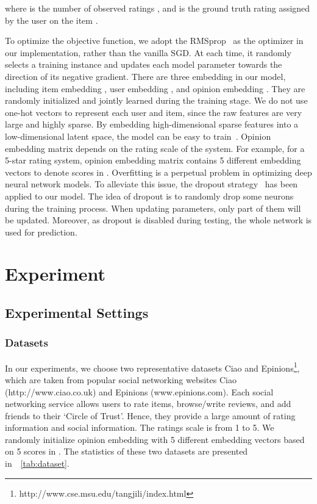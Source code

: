 \documentclass[sigconf]{acmart} \copyrightyear{2019}
\begin{document}
\noindent where  is the number of observed ratings , and  is the ground truth rating assigned by the user  on the item .

To optimize the objective function, we adopt the RMSprop~\cite{tieleman2012lecture} as the optimizer in our implementation, rather than the vanilla SGD. At each time, it randomly selects a training instance and updates each model parameter towards the direction of its negative gradient. There are three embedding in our model, including item embedding , user embedding , and opinion embedding . They are randomly initialized and jointly learned during the training stage.  We do not use one-hot vectors to represent each user and item, since the raw features are very large and highly sparse. By embedding high-dimensional sparse features into a low-dimensional latent space, the model can be easy to train~\cite{He2017NCF}. Opinion embedding matrix  depends on the rating scale of the system. For example, for a 5-star rating system,  opinion embedding matrix  contains 5 different embedding vectors to denote scores in . Overfitting is a perpetual problem in optimizing deep neural network models. To alleviate this issue, the dropout strategy~\citep{srivastava2014dropout} has been applied to our model. The idea of dropout is to randomly drop some neurons during the training process. When updating parameters, only part of them will be updated. Moreover, as dropout is disabled during testing, the whole network is used for prediction.  


 \section{Experiment}
\label{sec:Experiments}


\subsection{Experimental Settings}
\subsubsection{Datasets}
In our experiments, we choose two representative datasets Ciao and Epinions\footnote{http://www.cse.msu.edu/tangjili/index.html}, which are taken from popular social networking websites Ciao (http://www.ciao.co.uk) and Epinions (www.epinions.com). Each social networking service allows users to rate items, browse/write reviews, and add friends to their `Circle of Trust'. Hence, they provide a large amount of rating information and social information. The ratings scale is from 1 to 5. We randomly initialize opinion embedding with 5 different embedding vectors based on 5 scores in .  The statistics of these two datasets are presented in~\tablename ~\ref{tab:dataset}.
\end{document}
